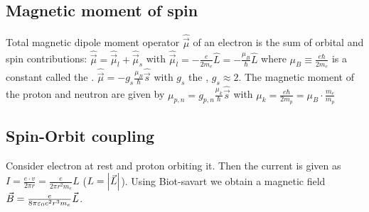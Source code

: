 \subsection{Magnetic moment of spin}
Total magnetic dipole moment operator $\hat{\vec{\mu}}$ of an electron is the sum
of orbital and spin contributions: $\hat{\vec{\mu}} = \hat{\vec{\mu}}_l + \hat{\vec{\mu}}_s$
with $\hat{\vec{\mu}}_l = - \frac{e}{2 m_e} \hat{L} = - \frac{\mu_B}{\hbar} \hat{L}$
where $\mu_B \equiv \frac{e \hbar}{2 m_e}$ is a constant called the .
$\hat{\vec{\mu}} = - g_s \frac{\mu_B}{\hbar} \hat{\vec{s}}$ with $g_s$ the , $g_s \approx 2$. The magnetic moment of the proton and neutron
are given by $\mu_{p,n} = g_{p,n} \frac{\mu_k}{\hbar} \hat{\vec{s}}$ with
$\mu_k = \frac{e \hbar}{2 m_p} = \mu_B \cdot \frac{m_e}{m_p}$


\subsection{Spin-Orbit coupling}
Consider electron at rest and proton orbiting it. Then the current is given as
$I = \frac{e \cdot v}{2 \pi r} = \frac{e}{2 \pi r^2 m_e} L$ ($L = \left\vert \vec{L} \right\vert$).
Using Biot-savart we obtain a magnetic field
$\vec{B} = \frac{e}{8 \pi \varepsilon_0 c^2 r^3 m_e} \vec{L}$.

